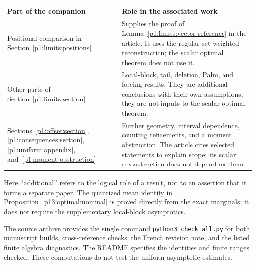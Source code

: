 \begin{center}
\small
\begin{tabularx}{\textwidth}{@{}>{\raggedright\arraybackslash}p{}>{\raggedright\arraybackslash}X@{}}
\toprule
Part of the companion & Role in the associated work\\
\midrule
Positional comparison in
Section~\ref{p1:limits:positions}
& Supplies the proof of Lemma~\ref{p1:limits:vector-reference}
in the article. It uses the regular-set weighted reconstruction;
the scalar optimal theorem does not use it.\\[4pt]
Other parts of Section~\ref{p1:limits:section}
& Local-block, tail, deletion, Palm, and forcing results.
They are additional conclusions with their own assumptions;
they are not inputs to the scalar optimal theorem.\\[4pt]
Sections~\ref{p1:offset:section},
\ref{p1:consequences:section}, \ref{p1:uniform:appendix},
and~\ref{p1:moment-obstruction}
& Further geometry, interval dependence, counting refinements,
and a moment obstruction. The article cites selected statements
to explain scope; its scalar reconstruction does not depend on them.\\
\bottomrule
\end{tabularx}
\end{center}

Here ``additional'' refers to the logical role of a result, not
to an assertion that it forms a separate paper. The quantized
mean identity in Proposition~\ref{p13:optimal:nominal} is proved
directly from the exact marginals; it does not require the
supplementary local-block asymptotics.

The source archive provides the single command
\texttt{python3 check\_all.py} for both manuscript builds,
cross-reference checks, the French revision note, and the listed
finite algebra diagnostics. The README specifies the identities
and finite ranges checked. These computations do not test the
uniform asymptotic estimates.

